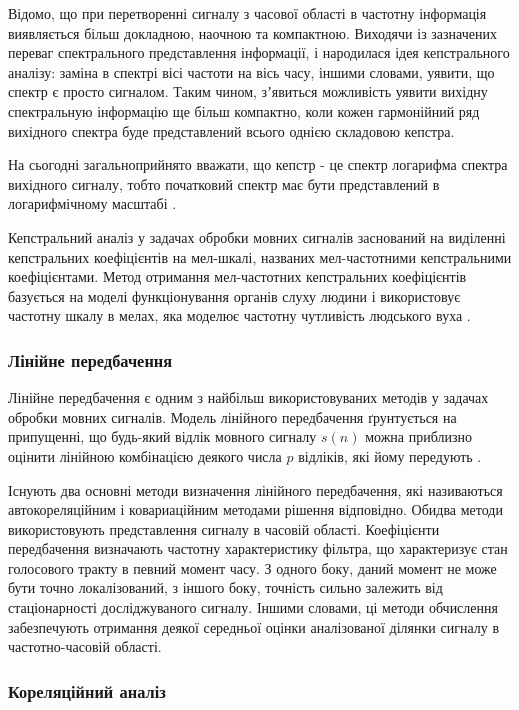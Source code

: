 Відомо, що при перетворенні сигналу з часової області в частотну інформація виявляється більш докладною, наочною та компактною. Виходячи із зазначених переваг спектрального представлення інформації, і народилася ідея кепстрального аналізу: заміна в спектрі вісі частоти на вісь часу, іншими словами, уявити, що спектр є просто сигналом. Таким чином, зʼявиться можливість уявити вихідну спектральную інформацію ще більш компактно, коли кожен гармонійний ряд вихідного спектра буде представлений всього однією складовою кепстра.

На сьогодні загальноприйнято вважати, що кепстр - це спектр логарифма спектра вихідного сигналу, тобто початковий спектр має бути представлений в логарифмічному масштабі \cite{Козлов_2013}.

Кепстральний аналіз у задачах обробки мовних сигналів заснований на виділенні кепстральних коефіцієнтів на мел-шкалі, названих мел-частотними кепстральними коефіцієнтами. Метод отримання мел-частотних кепстральних коефіцієнтів базується на моделі функціонування органів слуху людини і використовує частотну шкалу в мелах, яка моделює частотну чутливість людського вуха \cite{Huang_2001}.

\subsubsection{Лінійне передбачення}

Лінійне передбачення є одним з найбільш використовуваних методів у задачах обробки мовних сигналів. Модель лінійного передбачення ґрунтується на припущенні, що будь-який відлік мовного сигналу $s(n)$ можна приблизно оцінити лінійною комбінацією деякого числа $p$ відліків, які йому передують \cite{Любимов_1995}.

Існують два основні методи визначення лінійного передбачення, які називаються автокореляційним і ковариаційним методами рішення відповідно. Обидва методи використовують представлення сигналу в часовій області. Коефіцієнти передбачення визначають частотну характеристику фільтра, що характеризує стан голосового тракту в певний момент часу. З одного боку, даний момент не може бути точно локалізований, з іншого боку, точність сильно залежить від стаціонарності досліджуваного сигналу. Іншими словами, ці методи обчислення забезпечують отримання деякої середньої оцінки аналізованої ділянки сигналу в частотно-часовій області.

\subsubsection{Кореляційний аналіз}

